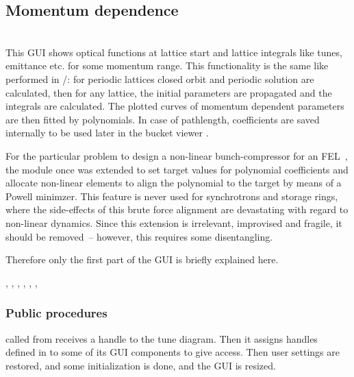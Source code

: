 \documentclass[12pt]{article}
\newcommand\code[1]{{\tt #1}}
\newcommand\guico[1]{{\color{blue}\code{#1}}}
\newcommand{\opagui}[1]{\colorbox{blue!20}{{\color{black}\code{#1}}}}
\newcommand{\oguih}[2]{\subsection{\label{#2}#1}{\Huge\opagui{#2}}\\}
\newcommand{\ogui}[1]{\hyperref[#1]{\opagui{#1}}}
\newcommand{\opaguif}[1]{\colorbox{violet!30}{{\color{black}\code{#1}}}}
\newcommand{\oguif}[1]{\hyperref[#1]{\opaguif{#1}}}
\newcommand{\opauni}[1]{\colorbox{orange!30}{{\color{black}\code{#1}}}}
\newcommand{\ouni}[1]{\hyperref[#1]{\opauni{#1}}}
\newcommand{\uses}[1]{\flushleft {\bf Uses:} #1}
\newcommand{\desc}[1]{#1}
\newcommand{\ppro}[1]{\subsubsection*{Public procedures} #1}
\newcommand{\todo}[1]{{\color{red} #1}}
\begin{document}
\oguih{Momentum dependence}{opamomentum}

\desc{This GUI shows optical functions at lattice start and lattice integrals like tunes, emittance etc. for some momentum range. This functionality is the same like performed in \ogui{opalinop}/\ouni{linoplib}: for periodic lattices closed orbit and periodic solution are calculated, then for any lattice, the initial parameters are propagated and the integrals are calculated. The plotted curves of momentum dependent parameters are then fitted by polynomials. In case of pathlength, coefficients are saved internally to be used later in the bucket viewer \ogui{opabucket}.

\todo{For the particular problem to design a non-linear bunch-compressor for an FEL~\cite{nlbuco}, the module once was extended to set target values for polynomial coefficients and allocate non-linear elements to align the polynomial to the target by means of a Powell minimzer. This feature is never used for synchrotrons and storage rings, where the side-effects of this brute force alignment are devastating with regard to non-linear dynamics. Since this extension is irrelevant, improvised and fragile, it should be removed~-- however, this requires some disentangling.}

Therefore only the first part of the GUI is briefly explained here.
}

\uses{\ouni{momentumlib}, \ouni{linoplib}, \ogui{opatunediag}, \ouni{globlib}, \ouni{mathlib}, \oguif{comfigureframe}, \ouni{comauxlib}} 

\ppro{
\guico{Start} called from \ogui{opamenu} receives a handle to the tune diagram. Then it assigns handles defined in \ouni{momentumlib} to some of its GUI components to give \ouni{momentumlib} access. Then user settings are restored, and some initialization is done, and the GUI is resized.
}
\end{document}
